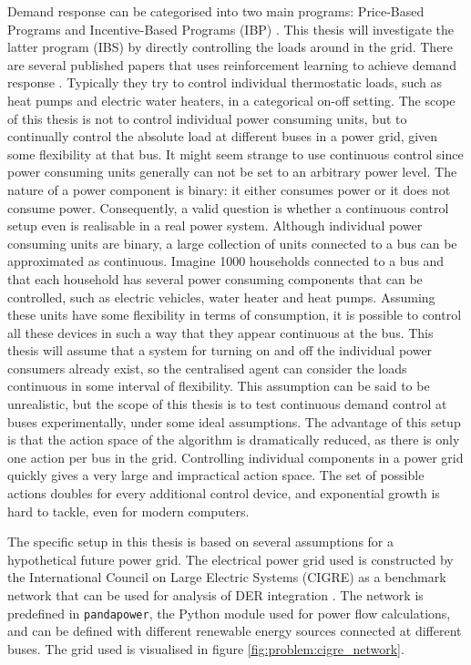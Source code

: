 \documentclass[class=book, crop=false]{standalone}
\begin{document}
Demand response can be categorised into two main programs: Price-Based Programs and Incentive-Based Programs (IBP) \cite{demand_response_definition}. This thesis will investigate the latter program (IBS) by directly controlling the loads around in the grid. There are several published papers that uses reinforcement learning to achieve demand response \cite{active_network_management}. Typically they try to control individual thermostatic loads, such as heat pumps and electric water heaters, in a categorical on-off setting. The scope of this thesis is not to control individual power consuming units, but to continually control the absolute load at different buses in a power grid, given some flexibility at that bus. It might seem strange to use continuous control since power consuming units generally can not be set to an arbitrary power level. The nature of a power component is binary: it either consumes power or it does not consume power. Consequently, a valid question is whether a continuous control setup even is realisable in a real power system. Although individual power consuming units are binary, a large collection of units connected to a bus can be approximated as continuous. Imagine 1000 households connected to a bus and that each household has several power consuming components that can be controlled, such as electric vehicles, water heater and heat pumps. Assuming these units have some flexibility in terms of consumption, it is possible to control all these devices in such a way that they appear continuous at the bus. This thesis will assume that a system for turning on and off the individual power consumers already exist, so the centralised agent can consider the loads continuous in some interval of flexibility. This assumption can be said to be unrealistic, but the scope of this thesis is to test continuous demand control at buses experimentally, under some ideal assumptions. The advantage of this setup is that the action space of the algorithm is dramatically reduced, as there is only one action per bus in the grid. Controlling individual components in a power grid quickly gives a very large and impractical action space. The set of possible actions doubles for every additional control device, and exponential growth is hard to tackle, even for modern computers.

The specific setup in this thesis is based on several assumptions for a hypothetical future power grid. The electrical power grid used is constructed by the International Council on Large Electric Systems (CIGRE) as a benchmark network that can be used for analysis of DER integration \cite{cigre}. The network is predefined in \texttt{pandapower}, the Python module used for power flow calculations, and can be defined with different renewable energy sources connected at different buses. The grid used is visualised in figure \ref{fig:problem:cigre_network}. 
\end{document}
